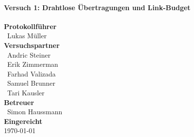 \documentclass[a4paper, 11pt, oneside]{Thesis}  %
\begin{document}
\begin{titlepage}
\HRule \\[0.4cm]
{ \huge \bfseries Versuch 1: Drahtlose Übertragungen und Link-Budget}\\[0.4cm] %
\HRule \\[1.5cm]
 
\textbf{Protokollführer}\\
{\large\ Lukas Müller}\\[0.5cm]
\textbf{Versuchspartner}\\
{\large\ Andric Steiner}\\[0.2cm]
{\large\ Erik Zimmerman}\\[0.2cm]
{\large\ Farhad Valizada}\\[0.2cm]
{\large\ Samuel Brunner}\\[0.2cm]
{\large\ Tari Kausler}\\[0.7cm]

\textbf{Betreuer}\\
{\large\ Simon Haussmann}\\[0.2cm]



\textbf{Eingereicht}\\
{\large \today} %

 

\vfill %

\end{titlepage}


\clearpage  %





%
%
\end{document}
